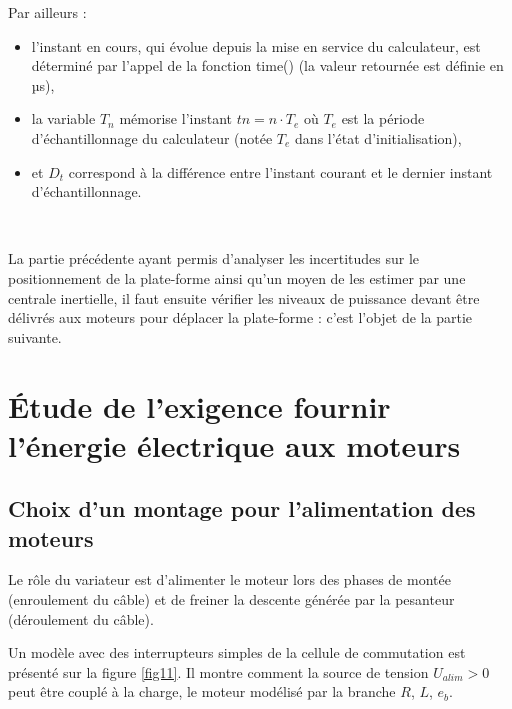 Par ailleurs :
\begin{itemize}
 \item l’instant en cours, qui évolue depuis la mise en service du calculateur, est déterminé par l’appel de la fonction time() (la valeur retournée est définie en µs),
 \item la variable $T_n$ mémorise l’instant $tn=n\cdot T_e$ où $T_e$ est la période d’échantillonnage du calculateur (notée $T_e$ dans l’état d’initialisation),
 \item et $D_t$ correspond à la différence entre l’instant courant et le dernier instant d’échantillonnage.
\end{itemize}


~\

La partie précédente ayant permis d’analyser les incertitudes sur le positionnement de la plate-forme ainsi qu’un moyen de les estimer par une centrale inertielle, il faut ensuite vérifier les niveaux de puissance devant être délivrés aux moteurs pour déplacer la plate-forme : c’est l’objet de la partie suivante.

\section{Étude de l’exigence \og fournir l’énergie électrique aux moteurs \fg}


\subsection{Choix d'un montage pour l'alimentation des moteurs}

Le rôle du variateur est d'alimenter le moteur lors des phases de montée (enroulement du câble) et de freiner la descente générée par la pesanteur (déroulement du câble).


Un modèle avec des interrupteurs simples de la cellule de commutation est présenté sur la figure \ref{fig11}. Il montre comment la source de tension $U_{alim}>0$ peut être couplé à la charge, le moteur modélisé par la branche $R$, $L$, $e_b$.


